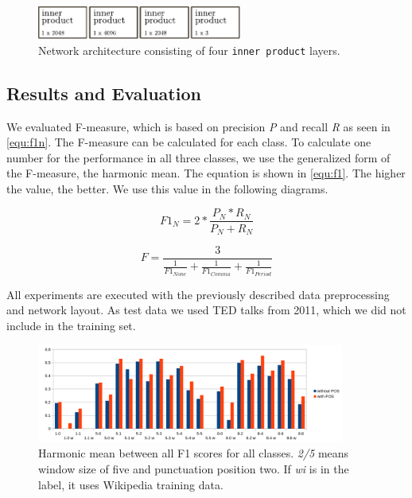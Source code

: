 \begin{figure}[ht]
    \centering
    \includegraphics[width=0.6\textwidth]{img/net_lexical.pdf}
    \caption{Network architecture consisting of four \texttt{inner product} layers.}
    \label{fig:net_lexical}
\end{figure}

\subsection{Results and Evaluation}

We evaluated F-measure, which is based on precision \emph{P} and recall \emph{R} as seen in \ref{equ:f1n}.
The F-measure can be calculated for each class.
To calculate one number for the performance in all three classes, we use the generalized form of the F-measure, the harmonic mean.
The equation is shown in \ref{equ:f1}.
The higher the value, the better.
We use this value in the following diagrams.

\begin{equation}
\label{equ:f1n}
F1_{N} = 2 * \frac{P_{N}* R_{N}}{P_{N}+R_{N}}
\end{equation}

\begin{equation}
\label{equ:f1}
F = \frac{3}{\frac{1}{F1_{None}} + \frac{1}{F1_{Comma}} + \frac{1}{F1_{Period}}}
\end{equation}

All experiments are executed with the previously described data preprocessing and network layout.
As test data we used TED talks from 2011, which we did not include in the training set.

\begin{figure}[ht]
    \centering
    \includegraphics[width=0.9\textwidth]{img/window_eval.png}
    \caption{Harmonic mean between all F1 scores for all classes. \emph{2/5} means window size of five and punctuation position two. If \emph{wi} is in the label, it uses Wikipedia training data.}
    \label{fig:window_eval}
\end{figure}

